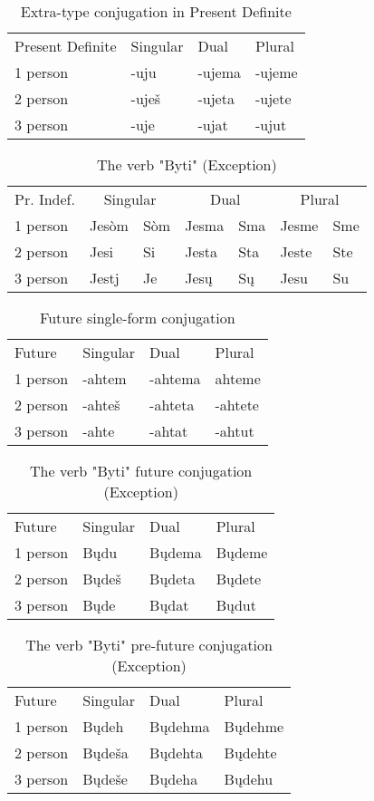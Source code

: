 \begin{table}[!htpb]
	\caption{Extra-type conjugation in Present Definite}
	\begin{tabular}{llll}
		Present Definite & Singular & Dual & Plural \\
		1 person & -uju & -ujema & -ujeme \\
		2 person & -uješ & -ujeta & -ujete \\
		3 person & -uje & -ujat & -ujut
	\end{tabular}
\end{table}

\begin{table}[!htpb]
	\caption{The verb "Byti" (Exception)}
	\begin{tabular}{lllllll}
		Pr. Indef.
		& \multicolumn{2}{c}{Singular}
		& \multicolumn{2}{c}{Dual}
		& \multicolumn{2}{c}{Plural} \\
		1 person & Jesòm & Sòm & Jesma & Sma & Jesme & Sme \\
		2 person & Jesi & Si & Jesta & Sta & Jeste & Ste \\
		3 person & Jestj & Je & Jesų & Sų & Jesu & Su
	\end{tabular}
\end{table}

\begin{table}[!htpb]
	\caption{Future single-form conjugation}
	\begin{tabular}{llll}
		Future
		& Singular
		& Dual
		& Plural \\
		1 person & -ahtem & -ahtema & ahteme \\
		2 person & -ahteš & -ahteta & -ahtete \\
		3 person & -ahte & -ahtat & -ahtut
	\end{tabular}
\end{table}

\begin{table}[!htpb]
	\caption{The verb "Byti" future conjugation (Exception)}
	\begin{tabular}{llll}
		Future
		& Singular
		& Dual
		& Plural \\
		1 person & Bųdu & Bųdema & Bųdeme \\
		2 person & Bųdeš & Bųdeta & Bųdete \\
		3 person & Bųde & Bųdat & Bųdut
	\end{tabular}
\end{table}

\begin{table}[!htpb]
	\caption{The verb "Byti" pre-future conjugation (Exception)}
	\begin{tabular}{llll}
		Future
		& Singular
		& Dual
		& Plural \\
		1 person & Bųdeh & Bųdehma & Bųdehme \\
		2 person & Bųdeša & Bųdehta & Bųdehte \\
		3 person & Bųdeše & Bųdeha & Bųdehu
	\end{tabular}
\end{table}

